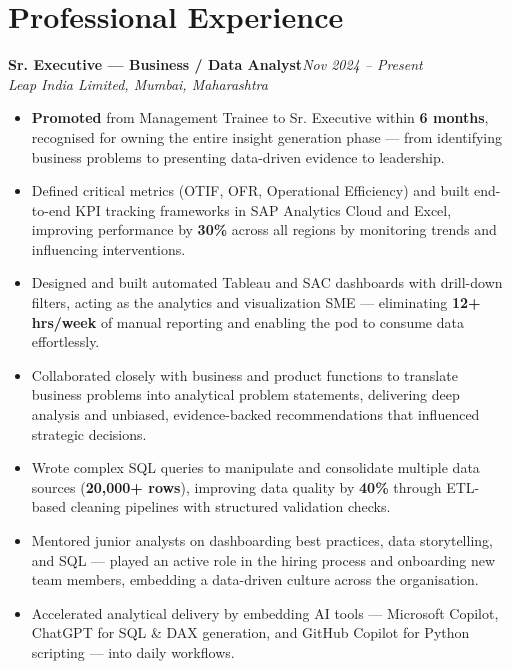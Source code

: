\documentclass[10pt, letterpaper]{article}
\newcommand{\role}[3]{%
  \vspace{2pt}%
  {\bfseries #1}\hfill{\small\color{muted}\textit{#3}}\\[-2pt]%
  {\small\color{muted}\textit{#2}}%
}
\begin{document}
\section{Professional Experience}

\role{Sr. Executive — Business / Data Analyst}{Leap India Limited, Mumbai, Maharashtra}{Nov 2024 – Present}

\begin{itemize}
  \item \textbf{Promoted} from Management Trainee to Sr. Executive within \textbf{6 months}, recognised for owning the entire insight generation phase — from identifying business problems to presenting data-driven evidence to leadership.
  \item Defined critical metrics (OTIF, OFR, Operational Efficiency) and built end-to-end KPI tracking frameworks in SAP Analytics Cloud and Excel, improving performance by \textbf{30\%} across all regions by monitoring trends and influencing interventions.
  \item Designed and built automated Tableau and SAC dashboards with drill-down filters, acting as the analytics and visualization SME — eliminating \textbf{12+ hrs/week} of manual reporting and enabling the pod to consume data effortlessly.
  \item Collaborated closely with business and product functions to translate business problems into analytical problem statements, delivering deep analysis and unbiased, evidence-backed recommendations that influenced strategic decisions.
  \item Wrote complex SQL queries to manipulate and consolidate multiple data sources (\textbf{20,000+ rows}), improving data quality by \textbf{40\%} through ETL-based cleaning pipelines with structured validation checks.
  \item Mentored junior analysts on dashboarding best practices, data storytelling, and SQL — played an active role in the hiring process and onboarding new team members, embedding a data-driven culture across the organisation.
  \item Accelerated analytical delivery by embedding AI tools — Microsoft Copilot, ChatGPT for SQL \& DAX generation, and GitHub Copilot for Python scripting — into daily workflows.
\end{itemize}

\vspace{1pt}
\end{document}

